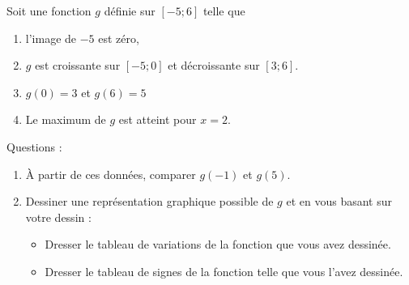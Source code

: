 
\begin{exercice}[\ldots/6]\label{exosmath-0631}

    Soit une fonction \( g\) définie sur \( [-5;6]\) telle que
    \begin{enumerate}
        \item
            l'image de \( -5\) est zéro,
        \item
            \( g\) est croissante sur \( [-5;0]\) et décroissante sur \( [3;6]\).
        \item
            \( g(0)=3\) et \( g(6)=5\)
        \item
            Le maximum de \( g\) est atteint pour \( x=2\).
    \end{enumerate}
    Questions :
    \begin{enumerate}
        \item
            À partir de ces données, comparer \( g(-1)\) et \( g(5)\).
        \item
            Dessiner une représentation graphique possible de \( g\) et en vous basant sur votre dessin :                
            \begin{itemize}
        \item
            Dresser le tableau de variations de la fonction que vous avez dessinée.
        \item
            Dresser le tableau de signes de la fonction telle que vous l'avez dessinée.
            \end{itemize}
    \end{enumerate}

\end{exercice}
